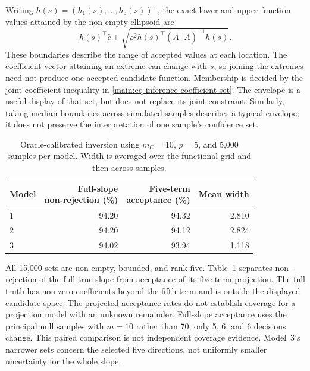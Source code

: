 Writing $h(s)=(h_1(s),\ldots,h_5(s))^\top$, the exact lower and upper
function values attained by the non-empty ellipsoid are
\begin{equation}
 h(s)^\top\widehat c
 \mathbin{\pm}\sqrt{\rho^2h(s)^\top(A^\top A)^{-1}h(s)}.
 \label{main:eq-inference-envelope}
\end{equation}
These boundaries describe the range of accepted values at each location.
The coefficient vector attaining an extreme can change with $s$, so joining
the extremes need not produce one accepted candidate function.  Membership
is decided by the joint coefficient inequality in
\eqref{main:eq-inference-coefficient-set}.  The envelope is a useful display
of that set, but does not replace its joint constraint.  Similarly, taking
median boundaries across simulated samples describes a typical envelope;
it does not preserve the interpretation of one sample's confidence set.

\begin{table}[htbp]
 \centering
 \small
 \caption[Five-dimensional inversion]{Oracle-calibrated inversion using
 $m_C=10$, $p=5$, and 5,000 samples per model.  Width is averaged over
 the functional grid and then across samples.}
 \label{main:tab-inference-confidence}
 \begin{tabular}{@{}lrrr@{}}
 \toprule
 Model & \shortstack{Full-slope\\non-rejection (\%)}
 & \shortstack{Five-term\\acceptance (\%)}
 & Mean width\\
 \midrule
 1 & 94.20 & 94.32 & 2.810\\
 2 & 94.20 & 94.12 & 2.824\\
 3 & 94.02 & 93.94 & 1.118\\
 \bottomrule
 \end{tabular}
\end{table}

All 15,000 sets are non-empty, bounded, and rank five.
Table~\ref{main:tab-inference-confidence} separates non-rejection of the
full true slope from acceptance of its five-term projection.  The full
truth has non-zero coefficients beyond the fifth term and is outside the
displayed candidate space.  The projected acceptance rates do not establish
coverage for a projection model with an unknown remainder.  Full-slope
acceptance uses the principal null samples with $m=10$ rather than 70;
only 5, 6, and 6 decisions change.  This paired comparison is not independent
coverage evidence.  Model~3's narrower sets concern the selected five
directions, not uniformly smaller uncertainty for the whole slope.

